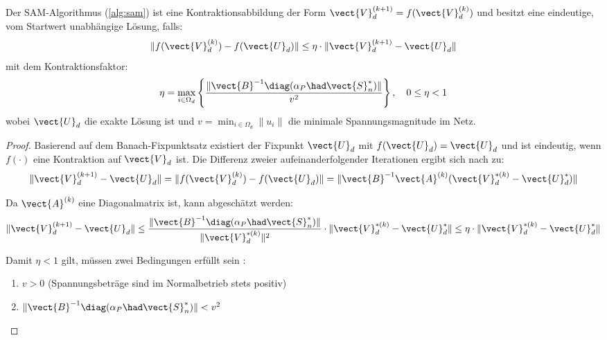 \begin{proposition}
	\label{prop:sam_kontraktion}
	Der SAM-Algorithmus (\cref{alg:sam}) ist eine Kontraktionsabbildung der Form $\vect{V}_d^{(k+1)} = f(\vect{V}_d^{(k)})$ und besitzt eine eindeutige, vom Startwert unabhängige Lösung, falls:
	\begin{equation}
		\|f(\vect{V}_d^{(k)}) - f(\vect{U}_d)\| \leq \eta \cdot \|\vect{V}_d^{(k+1)} - \vect{U}_d\|
		\label{eq:kontraktion_sam}
	\end{equation}
	mit dem Kontraktionsfaktor:
	\begin{equation}
		\eta = \max_{i \in \Omega_d} \left\{\frac{\|\vect{B}^{-1} \diag(\alpha_P \had \vect{S}_n^*)\|}{v^2}\right\}, \quad 0 \leq \eta < 1
		\label{eq:eta_giraldo}
	\end{equation}
	wobei $\vect{U}_d$ die exakte Lösung ist und $v = \min_{i \in \Omega_d} \|u_i\|$ die minimale Spannungsmagnitude im Netz.
\end{proposition}

\begin{proof}
	Basierend auf dem Banach-Fixpunktsatz existiert der Fixpunkt $\vect{U}_d$ mit $f(\vect{U}_d) = \vect{U}_d$ und ist eindeutig, wenn $f(\cdot)$ eine Kontraktion auf $\vect{V}_d$ ist. Die Differenz zweier aufeinanderfolgender Iterationen ergibt sich nach \cite{Giraldo2022} zu:
	\begin{equation}
		\|\vect{V}_d^{(k+1)} - \vect{U}_d\| = \|f(\vect{V}_d^{(k)}) - f(\vect{U}_d)\| = \|\vect{B}^{-1}\vect{A}^{(k)}(\vect{V}_d^{*(k)} - \vect{U}_d^*)\|
		\label{eq:kontraktion_beweis}
	\end{equation}
	
	Da $\vect{A}^{(k)}$ eine Diagonalmatrix ist, kann abgeschätzt werden:
	\begin{equation}
		\|\vect{V}_d^{(k+1)} - \vect{U}_d\| \leq \frac{\|\vect{B}^{-1} \diag(\alpha_P \had \vect{S}_n^*)\|}{\|\vect{V}_d^{*(k)}\|^2} \cdot \|\vect{V}_d^{*(k)} - \vect{U}_d^*\| \leq \eta \cdot \|\vect{V}_d^{*(k)} - \vect{U}_d^*\|
		\label{eq:sam_abschaetzung}
	\end{equation}
	
	Damit $\eta < 1$ gilt, müssen zwei Bedingungen erfüllt sein \cite{Giraldo2022}:
	\begin{enumerate}
		\item $v > 0$ (Spannungsbeträge sind im Normalbetrieb stets positiv)
		\item $\|\vect{B}^{-1}\diag(\alpha_P \had \vect{S}_n^*)\| < v^2$
	\end{enumerate}
\end{proof}

